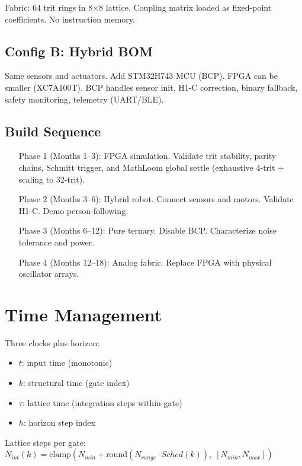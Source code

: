 \documentclass[11pt, a4paper]{report}
\begin{document}
Fabric: 64 trit rings in 8$\times$8 lattice. Coupling matrix loaded as
fixed-point coefficients. No instruction memory.

\section{Config B: Hybrid BOM}

Same sensors and actuators. Add STM32H743 MCU (BCP). FPGA can be smaller
(XC7A100T). BCP handles sensor init, H1-C correction, binary fallback,
safety monitoring, telemetry (UART/BLE).

\section{Build Sequence}

\begin{enumerate}[label=\textbf{Phase \arabic*} (Months \arabic*--\arabic*):, start=1]
  \item[Phase 1 (Months 1--3):] FPGA simulation. Validate trit stability, parity chains, Schmitt trigger, and MathLoom global settle (exhaustive 4-trit + scaling to 32-trit).
  \item[Phase 2 (Months 3--6):] Hybrid robot. Connect sensors and motors. Validate H1-C. Demo person-following.
  \item[Phase 3 (Months 6--12):] Pure ternary. Disable BCP. Characterize noise tolerance and power.
  \item[Phase 4 (Months 12--18):] Analog fabric. Replace FPGA with physical oscillator arrays.
\end{enumerate}

\chapter{Time Management}

Three clocks plus horizon:
\begin{itemize}[nosep]
  \item $t$: input time (monotonic)
  \item $k$: structural time (gate index)
  \item $\tau$: lattice time (integration steps within gate)
  \item $h$: horizon step index
\end{itemize}

Lattice steps per gate:
$N_{int}(k) = \text{clamp}(N_{min} + \text{round}(N_{range} \cdot Sched(k)),\; [N_{min}, N_{max}])$
\end{document}
